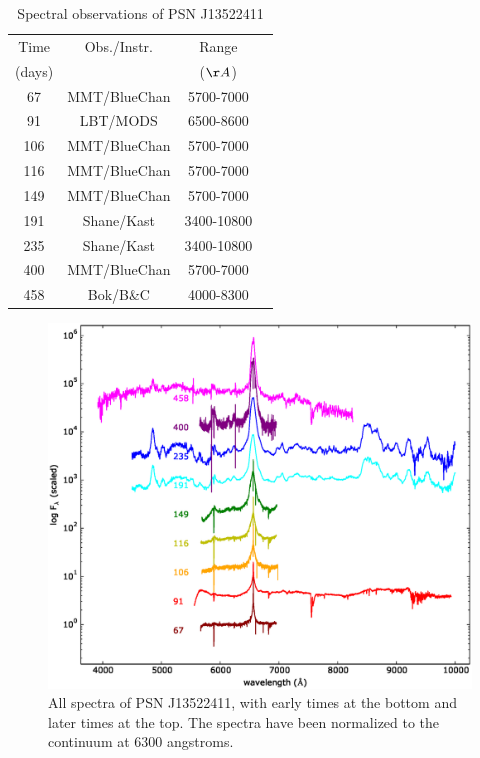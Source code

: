\documentclass[a4paper,fleqn,usenatbib]{mnras}
\begin{document}
\begin{table}
\caption{Spectral observations of PSN J13522411}
\centering
\label{tab:spectra}
\begin{tabular}{@{}cccc}
\hline
Time &Obs./Instr. &Range \\
(days) & &($\AA$) \\
\hline
67  &MMT/BlueChan &5700-7000 \\
91  &LBT/MODS     &6500-8600 \\
106 &MMT/BlueChan &5700-7000 \\
116 &MMT/BlueChan &5700-7000 \\
149 &MMT/BlueChan &5700-7000 \\
191 &Shane/Kast   &3400-10800 \\
235 &Shane/Kast   &3400-10800 \\
400 &MMT/BlueChan &5700-7000 \\
458 &Bok/B\&C     &4000-8300 \\
\hline
\end{tabular}
\end{table}

\begin{figure}
  \centering
  \includegraphics[width=18cm]{graphics/full.eps}
  \caption{All spectra of PSN J13522411, with early times at the bottom and later times at the top. The spectra have been normalized to the continuum at 6300 angstroms.}
  \label{fig:full}
\end{figure}
\end{document}
